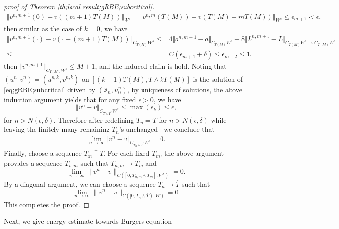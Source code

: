 \documentclass{article}
\numberwithin{equation}{section}
\newcommand{\m}{\mathbb}
\begin{document}
\begin{proof}[proof of Theorem \ref{th;local result;gRBE;subcritical}]
 \begin{align*}
     \Vert v^{n,m+1}(0)-v((m+1)T(M))\Vert_{W^s}= \Vert v^{n,m}(T(M))-v(T(M)+mT(M))\Vert_{W^s}\leq \epsilon_{m+1}<\epsilon,
 \end{align*}
 then similar as the case of $k=0$, we have
 \begin{align*}
      \Vert v^{n,m+1}(\cdot)-v(\cdot +(m+1)T(M))\Vert_{C_{T(M)}W^s}\leq &4\Vert a^{n,m+1}-a\Vert_{C_{T(M)}W^s} +8\Vert L^{n,m+1}-L\Vert_{C_{T(M)}W^s\to C_{T(M)}W^s} \\
 \leq&C(\epsilon_{m+1}+\delta)\leq \epsilon_{m+2}\leq 1.
 \end{align*}
then $\Vert v^{n,m+1}\Vert_{C_{T(M)}W^s} \leq M+1$, and the induced claim is hold. Noting that $(u^{n},v^{n})=(u^{n,k},v^{n,k})$ on $[(k-1)T(M),T\wedge kT(M)]$ is the solution of \eqref{eq;gRBE;subcritcal} driven by $(\m X_n, u^n_0)$, by uniqueness of solutions, the above induction argument yields that for any fixed $\epsilon>0$,  we have 
 \begin{equation}
     \Vert v^{n}-v\Vert_{C_{T\wedge T^*}W^s}\leq \max (\epsilon_k)\leq \epsilon,
 \end{equation}
 for $n>N(\epsilon,\delta)$. Therefore after redefining $T_n= T$ for $n>N(\epsilon,\delta)$ while leaving the finitely many remaining $T_n$'s unchanged , we conclude that
 \begin{align*}
     \lim_{n\to \infty}\Vert v^n-v\Vert_{C_{T_n\wedge T^*}W^s}=0.
 \end{align*}
Finally, choose a sequence \(T_m\uparrow\bar T\). For each fixed \(T_m\), the above argument provides a sequence \(T_{n,m}\) such that $T_{n,m}\to T_m$ and
\[
\lim_{n\to\infty}
\|v^n-v\|_{C([0,T_{n,m}\wedge T_m];W^s)}
=0 .
\]
By a diagonal argument, we can choose a sequence \(T_n\to\bar T\) such that
\[
\lim_{n\to\infty}
\|v^n-v\|_{C([0,T_n\wedge\bar T);W^s)}
=0 .
\]
This completes the proof.
\end{proof}
Next, we give energy estimate towards Burgers equation
\end{document}
